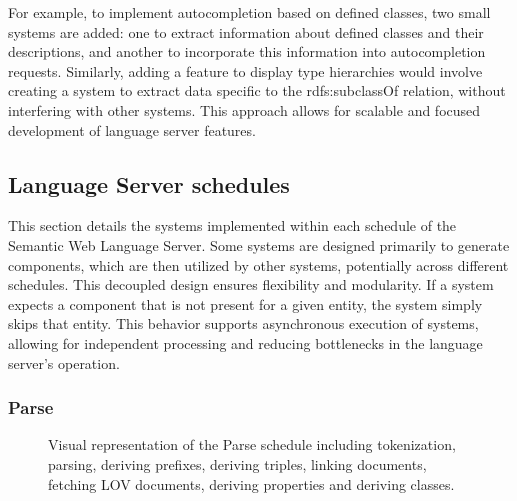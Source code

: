 For example, to implement autocompletion based on defined classes, two small systems are added:
  one to extract information about defined classes and their descriptions,
  and another to incorporate this information into autocompletion requests. 
Similarly, adding a feature to display type hierarchies would involve creating a system to extract data specific to the rdfs:subclassOf relation, without interfering with other systems.
This approach allows for scalable and focused development of language server features.


\subsection{Language Server schedules}

This section details the systems implemented within each schedule of the Semantic Web Language Server.
Some systems are designed primarily to generate components, which are then utilized by other systems, potentially across different schedules.
This decoupled design ensures flexibility and modularity. 
If a system expects a component that is not present for a given entity, the system simply skips that entity.
This behavior supports asynchronous execution of systems, allowing for independent processing and reducing bottlenecks in the language server’s operation.

\subsubsection{Parse}

\begin{figure}[tb]
 \centering
  \caption{Visual representation of the Parse schedule including tokenization, parsing, deriving prefixes, deriving triples, linking documents, fetching LOV documents, deriving properties and deriving classes. }\label{fig:Parse}
\end{figure}


